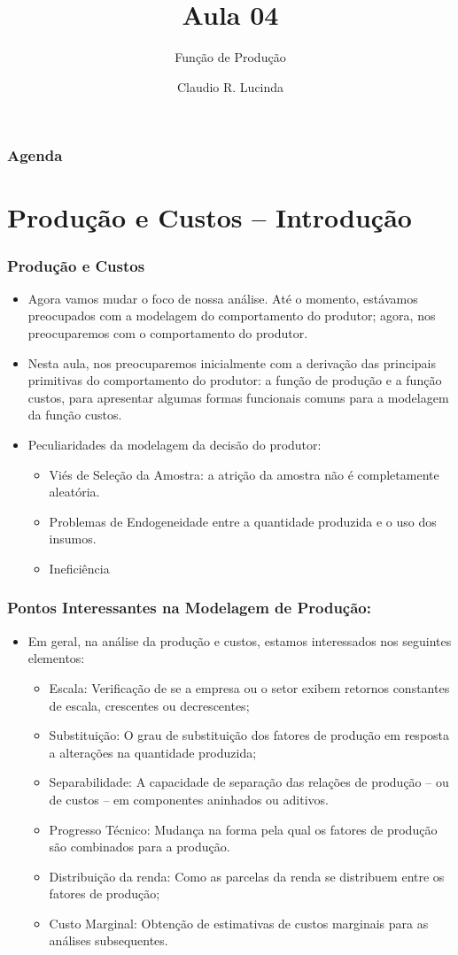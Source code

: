 \documentclass{beamer}
\title{Aula 04}
\subtitle{Função de Produção}
\author{Claudio R. Lucinda}
\institute{FEA-RP/USP}
\date{}
\begin{document}
\frame{\titlepage}
\begin{frame}\frametitle{Agenda}
  \tableofcontents[pausesections]
\end{frame}


\section{Produção e Custos -- Introdução}
\begin{frame}\frametitle{Produção e Custos}

\begin{itemize}
\item Agora vamos mudar o foco de nossa análise. Até o momento, estávamos
preocupados com a modelagem do comportamento do produtor; agora, nos
preocuparemos com o comportamento do produtor. 
\item Nesta aula, nos preocuparemos inicialmente com a derivação das principais
primitivas do comportamento do produtor: a função de produção e a
função custos, para apresentar algumas formas funcionais comuns para
a modelagem da função custos. 
\item Peculiaridades da modelagem da decisão do produtor:

\begin{itemize}
\item Viés de Seleção da Amostra: a atrição da amostra não é completamente
aleatória.
\item Problemas de Endogeneidade entre a quantidade produzida e o uso dos
insumos.
\item Ineficiência
\end{itemize}
\end{itemize}
\end{frame}

\begin{frame}\frametitle{Pontos Interessantes na Modelagem de Produção:}

\begin{itemize}
\item Em geral, na análise da produção e custos, estamos interessados nos
seguintes elementos:

\begin{itemize}
\item Escala: Verificação de se a empresa ou o setor exibem retornos constantes
de escala, crescentes ou decrescentes;
\item Substituição: O grau de substituição dos fatores de produção em resposta
a alterações na quantidade produzida;
\item Separabilidade: A capacidade de separação das relações de produção
-- ou de custos -- em componentes aninhados
ou aditivos.
\item Progresso Técnico: Mudança na forma pela qual os fatores de produção
são combinados para a produção.
\item Distribuição da renda: Como as parcelas da renda se distribuem entre
os fatores de produção;
\item Custo Marginal: Obtenção de estimativas de custos marginais para as
análises subsequentes. 
\end{itemize}
\end{itemize}
\end{frame}
\end{document}
